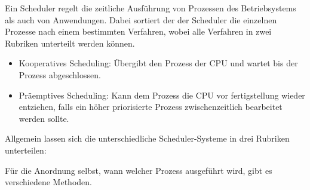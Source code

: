 \documentclass[../EDF Master Thesis.tex]{subfiles}
\begin{document}
Ein Scheduler regelt die zeitliche Ausführung von Prozessen des Betriebsystems als auch von Anwendungen.
Dabei sortiert der der Scheduler die einzelnen Prozesse nach einem bestimmten Verfahren, wobei alle Verfahren in zwei Rubriken unterteilt werden können.
\begin{itemize}
    \item Kooperatives Scheduling: Übergibt den Prozess der CPU und wartet bis der Prozess abgeschlossen.
    \item Präemptives Scheduling: Kann dem Prozess die CPU vor fertigstellung wieder entziehen, falls ein höher priorisierte Prozess zwischenzeitlich bearbeitet werden sollte.
\end{itemize}
Allgemein lassen sich die unterschiedliche Scheduler-Systeme in drei Rubriken unterteilen:
Für die Anordnung selbst, wann welcher Prozess ausgeführt wird, gibt es verschiedene Methoden.
\end{document}

